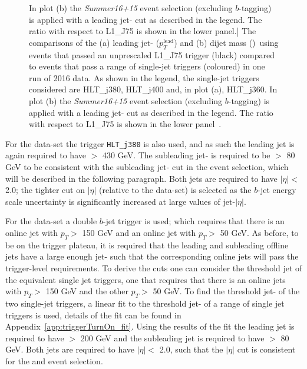 \begin{figure}[!ht]
            In plot (b) the \textit{Summer16+15} event selection (excluding $b$-tagging) is applied with a leading jet-\pT{} cut as described in the legend.
            The ratio with respect to L1\_J75 is shown in the lower panel.]
          {The comparisons of the (a) leading jet-\pT{} ($p_T^{\text{lead}}$) and (b) dijet mass (\mjj{})~using events that passed an
            unprescaled L1\_J75 trigger (black) compared to events that pass a range of single-jet triggers (coloured) in one run of 2016 data.
            As shown in the legend, the single-jet triggers considered are HLT\_j380, HLT\_j400 and, in plot (a), HLT\_j360.
            In plot (b) the \textit{Summer16+15} event selection (excluding $b$-tagging) is applied with a leading jet-\pT{} cut as described in the legend.
            The ratio with respect to L1\_J75 is shown in the lower panel~\cite{dibjet-ichep_conf}.}
     \label{fig:evt-ICHEP_turnon}
\end{figure}

For the \hm{} data-set the trigger \verb|HLT_j380| is also used,
and as such the leading jet is again required to have \pT{} $>$ 430 GeV.
The subleading jet-\pT{} is required to be $>$ 80 GeV to be consistent with the subleading jet-\pT{} cut in the \lm{} event selection,
which will be described in the following paragraph.
Both jets  are required to have $|\eta| <$ 2.0;
the tighter cut on $|\eta|$ (relative to the \summer{} data-set) is selected as the
$b$-jet energy scale uncertainty is significantly increased at large values of jet-$|\eta|$.

For the \lm{} data-set a double $b$-jet trigger is used;
which requires that there is an online jet with $p_T >$ 150 GeV and an online jet with $p_T >$ 50 GeV.
As before, to be on the trigger plateau, it is required that the leading and subleading offline jets
have a large enough jet-\pT{} such that the corresponding online jets will pass the trigger-level \pT{} requirements.
To derive the \pT{} cuts one can consider the threshold jet \pT{} of the equivalent single jet triggers,
one that requires that there is an online jets with $p_T >$ 150 GeV and the other $p_T >$ 50 GeV.
To find the threshold jet-\pT{} of the two single-jet triggers,
a linear fit to the threshold jet-\pT{} of a range of single jet triggers is used,
details of the fit can be found in Appendix~\ref{app:triggerTurnOn_fit}.
Using the results of the fit the leading jet is required to have \pT{} $>$ 200 GeV
and the subleading jet is required to have \pT{} $>$ 80 GeV.
Both jets  are required to have $|\eta| <$ 2.0,
such that the $|\eta|$ cut is consistent for the \lm{} and \hm{} event selection.

